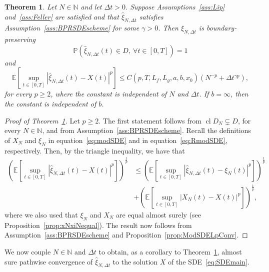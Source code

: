 \documentclass[11pt]{amsart}
\newtheorem{theorem}{Theorem}
\newcommand{\E}{{\mathbb E}}
\newcommand{\PP}{{\mathbb P}}
\newcommand{\CDDN}{\operatorname{cl} D_{N}}
\begin{document}
{\begin{theorem}\label{th:BPschemeConv}
Let $N \in \mathbb{N}$ and let $\Delta t >0$. Suppose Assumptions~\ref{ass:Lip} and~\ref{ass:Feller} are satisfied and that $\hat{\xi}_{N,\Delta t}$ satisfies Assumption~\ref{ass:BPRSDEscheme} for some $\gamma>0$. Then $\hat{\xi}_{N,\Delta t}$ is boundary-preserving
\begin{equation*}
\PP \left( \hat{\xi}_{N,\Delta t}(t) \in D,\ \forall t \in [0,T] \right)=1
\end{equation*}
and
\begin{equation*}
\E \left[ \sup_{t \in [0,T]} |\hat{\xi}_{N,\Delta t}(t) - X(t)|^{p} \right] \leq C(p,T,L_{f},L_{g},a,b,x_{0}) \left( N^{-p} + \Delta t^{\gamma p} \right),
\end{equation*}
for every $p \geq 2$, where the constant is independent of $N$ and $\Delta t$. If $b=\infty$, then the constant is independent of $b$.
\end{theorem}
\begin{proof}[Proof of Theorem~\ref{th:BPschemeConv}]
Let $p \geq 2$. The first statement follows from $\CDDN \subsetneq D$, for every $N \in \mathbb{N}$, and from Assumption~\ref{ass:BPRSDEscheme}. Recall the definitions of $X_{N}$ and $\xi_{N}$ in equation~\eqref{eq:modSDE} and in equation~\eqref{eq:RmodSDE}, respectively. Then, by the triangle inequality, we have that
\begin{align*}
\left( \E \left[ \sup_{t \in [0,T]} |\hat{\xi}_{N,\Delta t}(t) - X(t)|^{p} \right] \right)^{\frac{1}{p}} &\leq \left( \E \left[ \sup_{t \in [0,T]} |\hat{\xi}_{N,\Delta t}(t) - \xi_{N}(t)|^{p} \right] \right)^{\frac{1}{p}} \\ &+ \left( \E \left[ \sup_{t \in [0,T]} |X_{N}(t) - X(t)|^{p} \right] \right)^{\frac{1}{p}},
\end{align*}
where we also used that $\xi_{N}$ and $X_{N}$ are equal almost surely (see Proposition~\ref{prop:xNxiNequal}). The result now follows from Assumption~\ref{ass:BPRSDEscheme} and  Proposition~\ref{prop:ModSDELpConv}.
\end{proof}

We now couple $N \in \mathbb{N}$ and $\Delta t$ to obtain, as a corollary to Theorem~\ref{th:BPschemeConv}, almost sure pathwise convergence of $\hat{\xi}_{N,\Delta t}$ to the solution $X$ of the SDE~\eqref{eq:SDEmain}.

}
\end{document}
